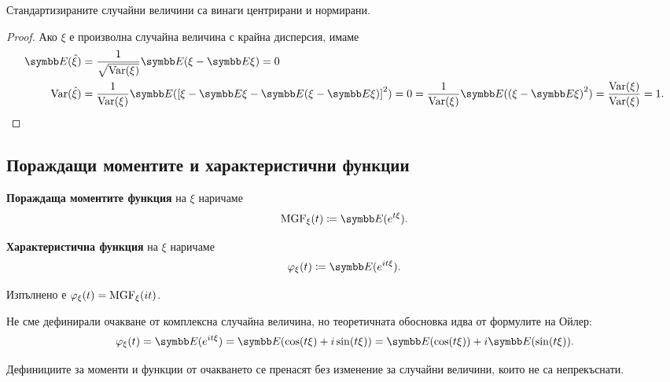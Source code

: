 \documentclass[numbers=endperiod, bibliography=totocnumbered]{scrartcl}
\begin{document}
\begin{proposition}
  Стандартизираните случайни величини са винаги центрирани и нормирани.
\end{proposition}
\begin{proof}
  Ако \( \xi \) е произволна случайна величина с крайна дисперсия, имаме
  \begin{align*}
    \Expect(\hat \xi)
    &=
    \frac 1 {\sqrt{\Var(\xi)}} \Expect(\xi - \Expect\xi)
    =
    0
    \\
    \Var(\hat \xi)
    &=
    \frac 1 {\Var(\xi)} \Expect({\left[ \xi - \Expect\xi - \Expect(\xi - \Expect\xi) \right]}^2) = 0
    =
    \frac 1 {\Var(\xi)} \Expect({(\xi - \Expect\xi)}^2)
    =
    \frac {\Var(\xi)} {\Var(\xi)}
    =
    1.
  \end{align*}
\end{proof}

\subsection{Пораждащи моментите и характеристични функции}

\begin{definition}
  \textbf{Пораждаща моментите функция} на \( \xi \) наричаме
  \begin{equation*}
    \MGF_\xi (t) \coloneqq \Expect(e^{t\xi}).
  \end{equation*}

  \textbf{Характеристична функция} на \( \xi \) наричаме
  \begin{equation*}
    \Char_\xi (t) \coloneqq \Expect(e^{it\xi}).
  \end{equation*}

  Изпълнено е \( \varphi_\xi(t) = \operatorname{MGF}_\xi(it) \).
\end{definition}

\begin{remark}
  Не сме дефинирали очакване от комплексна случайна величина, но теоретичната обосновка идва от формулите на Ойлер:
  \begin{equation*}
    \Char_\xi (t)
    =
    \Expect(e^{it\xi})
    =
    \Expect(\cos(t\xi) + i\sin(t\xi))
    =
    \Expect(\cos(t\xi)) + i \Expect(\sin(t\xi)).
  \end{equation*}
\end{remark}

\begin{remark}
  Дефинициите за моменти и функции от очакването се пренасят без изменение за случайни величини, които не са непрекъснати.
\end{remark}
\end{document}
